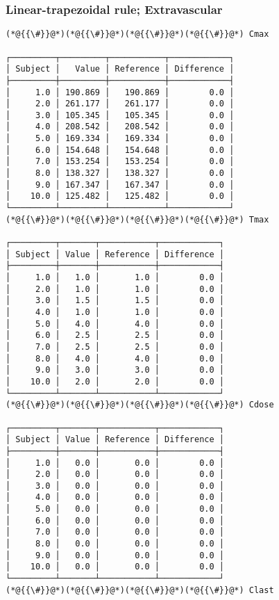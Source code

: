 \documentclass[12pt,a4paper]{article}
\begin{document}
\subsubsection{Linear-trapezoidal rule; Extravascular}

\begin{lstlisting}
(*@{{\#}}@*)(*@{{\#}}@*)(*@{{\#}}@*)(*@{{\#}}@*) Cmax

┌─────────┬─────────┬───────────┬────────────┐
│ Subject │   Value │ Reference │ Difference │
├─────────┼─────────┼───────────┼────────────┤
│     1.0 │ 190.869 │   190.869 │        0.0 │
│     2.0 │ 261.177 │   261.177 │        0.0 │
│     3.0 │ 105.345 │   105.345 │        0.0 │
│     4.0 │ 208.542 │   208.542 │        0.0 │
│     5.0 │ 169.334 │   169.334 │        0.0 │
│     6.0 │ 154.648 │   154.648 │        0.0 │
│     7.0 │ 153.254 │   153.254 │        0.0 │
│     8.0 │ 138.327 │   138.327 │        0.0 │
│     9.0 │ 167.347 │   167.347 │        0.0 │
│    10.0 │ 125.482 │   125.482 │        0.0 │
└─────────┴─────────┴───────────┴────────────┘
(*@{{\#}}@*)(*@{{\#}}@*)(*@{{\#}}@*)(*@{{\#}}@*) Tmax

┌─────────┬───────┬───────────┬────────────┐
│ Subject │ Value │ Reference │ Difference │
├─────────┼───────┼───────────┼────────────┤
│     1.0 │   1.0 │       1.0 │        0.0 │
│     2.0 │   1.0 │       1.0 │        0.0 │
│     3.0 │   1.5 │       1.5 │        0.0 │
│     4.0 │   1.0 │       1.0 │        0.0 │
│     5.0 │   4.0 │       4.0 │        0.0 │
│     6.0 │   2.5 │       2.5 │        0.0 │
│     7.0 │   2.5 │       2.5 │        0.0 │
│     8.0 │   4.0 │       4.0 │        0.0 │
│     9.0 │   3.0 │       3.0 │        0.0 │
│    10.0 │   2.0 │       2.0 │        0.0 │
└─────────┴───────┴───────────┴────────────┘
(*@{{\#}}@*)(*@{{\#}}@*)(*@{{\#}}@*)(*@{{\#}}@*) Cdose

┌─────────┬───────┬───────────┬────────────┐
│ Subject │ Value │ Reference │ Difference │
├─────────┼───────┼───────────┼────────────┤
│     1.0 │   0.0 │       0.0 │        0.0 │
│     2.0 │   0.0 │       0.0 │        0.0 │
│     3.0 │   0.0 │       0.0 │        0.0 │
│     4.0 │   0.0 │       0.0 │        0.0 │
│     5.0 │   0.0 │       0.0 │        0.0 │
│     6.0 │   0.0 │       0.0 │        0.0 │
│     7.0 │   0.0 │       0.0 │        0.0 │
│     8.0 │   0.0 │       0.0 │        0.0 │
│     9.0 │   0.0 │       0.0 │        0.0 │
│    10.0 │   0.0 │       0.0 │        0.0 │
└─────────┴───────┴───────────┴────────────┘
(*@{{\#}}@*)(*@{{\#}}@*)(*@{{\#}}@*)(*@{{\#}}@*) Clast


\end{lstlisting}
\end{document}

